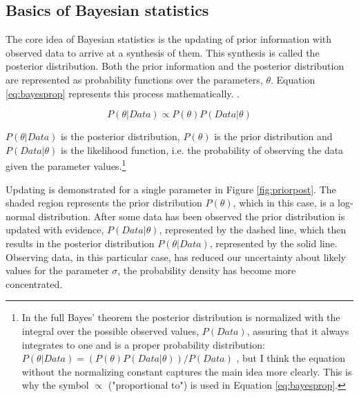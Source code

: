 \documentclass{article}\usepackage{knitr}
\begin{document}
\subsection{Basics of Bayesian statistics}

The core idea of Bayesian statistics is the updating of prior information with observed data to arrive at a synthesis of them. This synthesis is called the posterior distribution. Both the prior information and the posterior distribution are represented as probability functions over the parameters, $\theta$. Equation \ref{eq:bayesprop} represents this process mathematically. \citep{kruschke2015}.

\begin{equation}
P(\theta | Data) \propto P(\theta) P(Data | \theta)
\label{eq:bayesprop}
\end{equation} 

$P(\theta | Data)$ is the posterior distribution, $P(\theta)$ is the prior distribution and $P(Data | \theta)$ is the likelihood function, i.e. the probability of observing the data given the parameter values.\footnote{In the full Bayes' theorem the posterior distribution is normalized with the integral over the possible observed values, $P(Data)$, assuring that it always integrates to one and is a proper probability distribution: $P(\theta | Data) = (P(\theta) P(Data | \theta)) / P(Data)$ \citep{kruschke2015}, but I think the equation without the normalizing constant captures the main idea more clearly. This is why the symbol $\propto$ ("proportional to") is used in Equation \ref{eq:bayesprop}.}

Updating is demonstrated for a single parameter in Figure \ref{fig:priorpost}. The shaded region represents the prior distribution $P(\theta)$, which in this case, is a log-normal distribution.  After some data has been observed the prior distribution is updated with evidence, $P(Data | \theta)$, represented by the dashed line, which then results in the posterior distribution $P(\theta | Data)$, represented by the solid line. Observing data, in this particular case, has reduced our uncertainty about likely values for the parameter $\sigma$, the probability density has become more concentrated.
\end{document}
